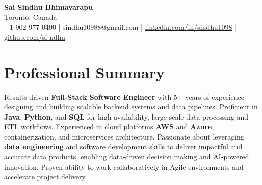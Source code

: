 \documentclass[letterpaper,11pt]{article}
\begin{document}
\begin{center}
  {\Large \textbf{Sai Sindhu Bhimavarapu}} \\
  Toronto, Canada \\
  +1-902-977-0490 \enspace | \enspace sindhu10988@gmail.com \enspace | \enspace \href{https://www.linkedin.com/in/sindhu1098/}{linkedin.com/in/sindhu1098} \enspace | \enspace \href{https://github.com/si-ndhu}{github.com/si-ndhu}
\end{center}

\section{Professional Summary}
  \begin{itemize}[leftmargin=0.15in, label={}]
    \small{\item{
     Results-driven \textbf{Full-Stack Software Engineer} with 5+ years of experience designing and building scalable backend systems and data pipelines. Proficient in \textbf{Java}, \textbf{Python}, and \textbf{SQL} for high-availability, large-scale data processing and ETL workflows. Experienced in cloud platforms \textbf{AWS} and \textbf{Azure}, containerization, and microservices architecture. Passionate about leveraging \textbf{data engineering} and software development skills to deliver impactful and accurate data products, enabling data-driven decision making and AI-powered innovation. Proven ability to work collaboratively in Agile environments and accelerate project delivery.
    }}
  \end{itemize}
\vspace{-16pt}

\end{document}

